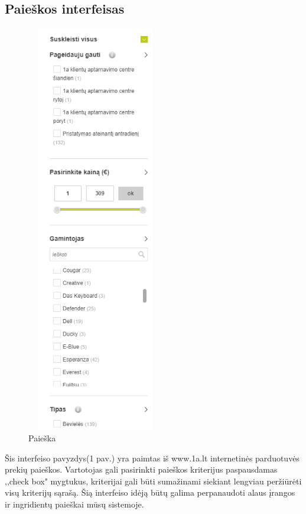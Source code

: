 \documentclass[oneside]{VUMIFPSkursinis}
\begin{document}
	\subsection{Paieškos interfeisas}
		\begin{figure}[h]
			\centering
			\includegraphics[width=6cm,height=18cm,keepaspectratio]{IkvepiantisInterfeisas1.png}
			\caption{ Paieška}
		\end{figure}

		Šis interfeiso pavyzdys(1 pav.) yra paimtas iš www.1a.lt internetinės parduotuvės prekių paieškos.
		Vartotojas gali pasirinkti paieškos kriterijus paspausdamas ,,check box" mygtukus, kriterijai gali būti sumažinami siekiant lengviau peržiūrėti visų kriterijų sąrašą.
		Šią interfeiso idėją būtų galima perpanaudoti alaus įrangos ir ingridientų paieškai mūsų sistemoje.
	\pagebreak
\end{document}
